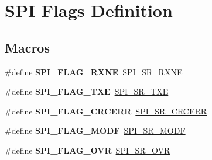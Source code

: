 \hypertarget{group___s_p_i___flags__definition}{}\section{S\+PI Flags Definition}
\label{group___s_p_i___flags__definition}
\subsection*{Macros}
\begin{DoxyCompactItemize}
\item 
\#define {\bfseries S\+P\+I\+\_\+\+F\+L\+A\+G\+\_\+\+R\+X\+NE}~\hyperlink{group___peripheral___registers___bits___definition_ga40e14de547aa06864abcd4b0422d8b48}{S\+P\+I\+\_\+\+S\+R\+\_\+\+R\+X\+NE}\hypertarget{group___s_p_i___flags__definition_ga7bd627ae57160a2f0aad1736194b5999}{}\label{group___s_p_i___flags__definition_ga7bd627ae57160a2f0aad1736194b5999}

\item 
\#define {\bfseries S\+P\+I\+\_\+\+F\+L\+A\+G\+\_\+\+T\+XE}~\hyperlink{group___peripheral___registers___bits___definition_ga5bd5d21816947fcb25ccae7d3bf8eb2c}{S\+P\+I\+\_\+\+S\+R\+\_\+\+T\+XE}\hypertarget{group___s_p_i___flags__definition_gaf84a1e6af2739a6be58e1b23d9e6b914}{}\label{group___s_p_i___flags__definition_gaf84a1e6af2739a6be58e1b23d9e6b914}

\item 
\#define {\bfseries S\+P\+I\+\_\+\+F\+L\+A\+G\+\_\+\+C\+R\+C\+E\+RR}~\hyperlink{group___peripheral___registers___bits___definition_ga69e543fa9584fd636032a3ee735f750b}{S\+P\+I\+\_\+\+S\+R\+\_\+\+C\+R\+C\+E\+RR}\hypertarget{group___s_p_i___flags__definition_ga30fb6af50e1f3c61cb9de76b0101c889}{}\label{group___s_p_i___flags__definition_ga30fb6af50e1f3c61cb9de76b0101c889}

\item 
\#define {\bfseries S\+P\+I\+\_\+\+F\+L\+A\+G\+\_\+\+M\+O\+DF}~\hyperlink{group___peripheral___registers___bits___definition_gabaa043349833dc7b8138969c64f63adf}{S\+P\+I\+\_\+\+S\+R\+\_\+\+M\+O\+DF}\hypertarget{group___s_p_i___flags__definition_gac7d3525ab98cc18f02270a4dba685897}{}\label{group___s_p_i___flags__definition_gac7d3525ab98cc18f02270a4dba685897}

\item 
\#define {\bfseries S\+P\+I\+\_\+\+F\+L\+A\+G\+\_\+\+O\+VR}~\hyperlink{group___peripheral___registers___bits___definition_gaa8d902302c5eb81ce4a57029de281232}{S\+P\+I\+\_\+\+S\+R\+\_\+\+O\+VR}\hypertarget{group___s_p_i___flags__definition_gab45264da2296c75495a7437a045513ea}{}\label{group___s_p_i___flags__definition_gab45264da2296c75495a7437a045513ea}


\end{DoxyCompactItemize}
